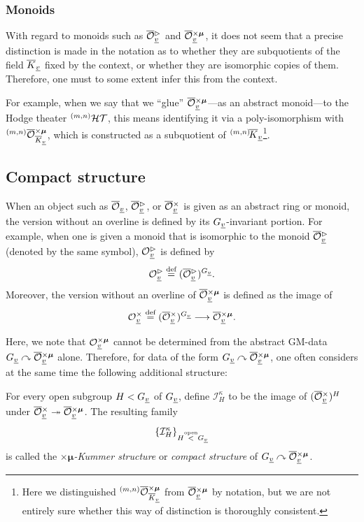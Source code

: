 \documentclass[12pt, reqno, a4paper]{amsart}
\def\udl#1{\underline{#1}} %
\def\longto{\longrightarrow}
\def\eqdef{\stackrel{\textrm{def}}{=}} %
\def\acton{\curvearrowright} %
\def\surjto{\twoheadrightarrow}
\def\cI{{\mathcal{I}}}
\def\uv{\udl{v}} %
\def\bmu{\bm{\mu}}
\def\xmu{\times\bmu}
\begin{document}
\subsubsection{Monoids}
With regard to monoids such as $\oOOt_{\uv}$ and $\oOOxmu_{\uv}$, it does not seem that a precise distinction is made in the notation as to whether they are subquotients of the field $\oK_{\uv}$ fixed by the context, or whether they are isomorphic copies of them. Therefore, one must to some extent infer this from the context.

For example, when we say that we ``glue'' $\oOOxmu_{\uv}$—as an abstract monoid—to the Hodge theater $\HT[(m,n)]$, this means identifying it via a poly-isomorphism with $\oOOxmu[(m,n)]_{\oK_{\uv}}$, which is constructed as a subquotient of $\oK[(m,n)]_{\uv}$\footnote{Here we distinguished $\oOOxmu[(m,n)]_{\oK_{\uv}}$ from $\oOOxmu_{\uv}$ by notation, but we are not entirely sure whether this way of distinction is thoroughly consistent.}.


\subsection{Compact structure}\label{sub:cptStr}
When an object such as $\oOO_{\uv}$, $\oOOt_{\uv}$, or $\oOOx_{\uv}$ is given as an abstract ring or monoid, the version without an overline is defined by its $\GG_{\uv}$-invariant portion.
For example, when one is given a monoid that is isomorphic to the monoid $\oOOt_{\uv}$ (denoted by the same symbol), $\OOt_{\uv}$ is defined by
$$
\OOt_{\uv}\eqdef(\oOOt_{\uv})^{\GG_{\uv}}.
$$
Moreover, the version without an overline of $\oOOxmu_{\uv}$ is defined as the image of
$$
\OOx_{\uv}\eqdef(\oOOx_{\uv})^{\GG_{\uv}}\longto\oOOxmu_{\uv}.
$$


Here, we note that $\OOxmu_{\uv}$ cannot be determined from the abstract GM-data $\GG_{\uv}\acton \oOOxmu_{\uv}$ alone.
Therefore, for data of the form $\GG_{\uv}\acton \oOOxmu_{\uv}$, one often considers at the same time the following additional structure:
\begin{dfn}[$\xmu$-Kummer structure]\label{dfn:compactStructure}
For every open subgroup $H<\GG_{\uv}$ of $\GG_{\uv}$, define $\cI^{\kappa}_H$ to be the image of $(\oOOx_{\uv})^H$ under $\oOOx_{\uv}\surjto\oOOxmu_{\uv}$.
The resulting family
$$
\{\cI^{\kappa}_H\}_{H\overset{\text{open}}{<}\GG_{\uv}}
$$
is called the {\em $\xmu$-Kummer structure} or {\em compact structure} of $\GG_{\uv}\acton \oOOxmu_{\uv}$.
\end{dfn}
\end{document}
